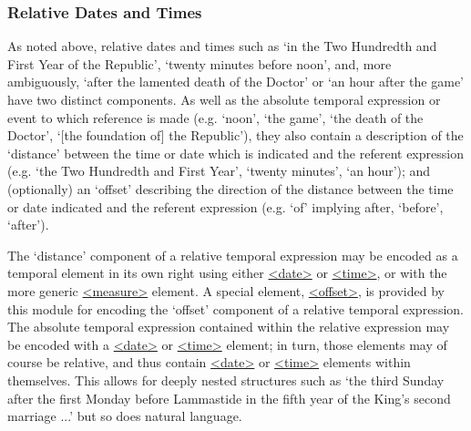 \subsubsection[{Relative Dates and Times }]{Relative Dates and Times }\label{NDDATER}\par
As noted above, relative dates and times such as ‘in the Two Hundredth and First Year of the Republic’, ‘twenty minutes before noon’, and, more ambiguously, ‘after the lamented death of the Doctor’ or ‘an hour after the game’ have two distinct components. As well as the absolute temporal expression or event to which reference is made (e.g. ‘noon’, ‘the game’, ‘the death of the Doctor’, ‘[the foundation of] the Republic’), they also contain a description of the ‘distance’ between the time or date which is indicated and the referent expression (e.g. ‘the Two Hundredth and First Year’, ‘twenty minutes’, ‘an hour’); and (optionally) an ‘offset’ describing the direction of the distance between the time or date indicated and the referent expression (e.g. ‘of’ implying after, ‘before’, ‘after’).\par
The ‘distance’ component of a relative temporal expression may be encoded as a temporal element in its own right using either \hyperref[TEI.date]{<date>} or \hyperref[TEI.time]{<time>}, or with the more generic \hyperref[TEI.measure]{<measure>} element. A special element, \hyperref[TEI.offset]{<offset>}, is provided by this module for encoding the ‘offset’ component of a relative temporal expression. The absolute temporal expression contained within the relative expression may be encoded with a \hyperref[TEI.date]{<date>} or \hyperref[TEI.time]{<time>} element; in turn, those elements may of course be relative, and thus contain \hyperref[TEI.date]{<date>} or \hyperref[TEI.time]{<time>} elements within themselves. This allows for deeply nested structures such as ‘the third Sunday after the first Monday before Lammastide in the fifth year of the King's second marriage ...’ but so does natural language.\par
